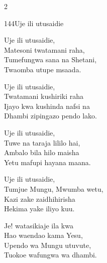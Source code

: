\documentclass{article}
\begin{document}
\begin{multicols}{2}
\begin{hymn}{144}{Uje ili utusaidie}{}
\begin{stanza}
Uje ili utusaidie,\\
Matesoni twatamani raha,\\
Tumefungwa sana na Shetani,\\
Twaomba utupe msaada.
\end{stanza}
\begin{stanza}
Uje ili utusaidie,\\
Twatamani kushiriki raha\\
Ijayo kwa kushinda nafsi na\\
Dhambi zipingazo pendo lako.
\end{stanza}
\begin{stanza}
Uje ili utusaidie,\\
Tuwe na taraja lililo hai,\\
Ambalo bila hilo maisha\\
Yetu mafupi hayana maana.
\end{stanza}
\begin{stanza}
Uje ili utusaidie,\\
Tumjue Mungu, Mwumba wetu,\\
Kazi zake zaidhihirisha\\
Hekima yake iliyo kuu.
\end{stanza}
\begin{stanza}
Je! watasikiaje ila kwa\\
Hao waendao kama Yesu,\\
Upendo wa Mungu utuvute,\\
Tuokoe wafungwa wa dhambi.
\end{stanza}
\end{hymn}


\end{multicols}
\end{document}
